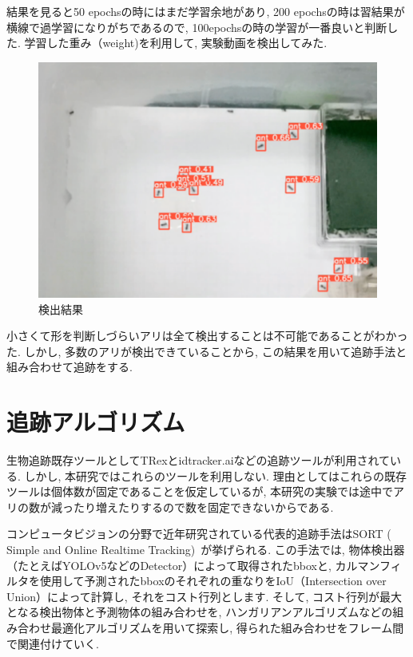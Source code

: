﻿\documentclass[a4paper, 12pt]{jsreport}
\begin{document}
結果を見ると50 epochsの時にはまだ学習余地があり, 200 epochsの時は習結果が横線で過学習になりがちであるので, 100epochsの時の学習が一番良いと判断した. 学習した重み（weight)を利用して, 実験動画を検出してみた. 
\begin{figure}[tbp]
\centering
\includegraphics[width=13cm,  keepaspectratio]{detec.pdf}
\caption[Short figure caption for List of Figures]{検出結果}
\label{fig:paper1_fig6}
\end{figure}
小さくて形を判断しづらいアリは全て検出することは不可能であることがわかった. しかし, 多数のアリが検出できていることから, この結果を用いて追跡手法と組み合わせて追跡をする. 

\section{追跡アルゴリズム}
\label{sec:tracking}
生物追跡既存ツールとしてTRexとidtracker.aiなどの追跡ツールが利用されている. しかし, 本研究ではこれらのツールを利用しない. 理由としてはこれらの既存ツールは個体数が固定であることを仮定しているが, 本研究の実験では途中でアリの数が減ったり増えたりするので数を固定できないからである. 

コンピュータビジョンの分野で近年研究されている代表的追跡手法はSORT ( Simple and Online Realtime Tracking)~\cite{7}が挙げられる. この手法では, 物体検出器（たとえばYOLOv5などのDetector）によって取得されたbboxと, カルマンフィルタを使用して予測されたbboxのそれぞれの重なりをIoU（Intersection over Union）によって計算し, それをコスト行列とします. そして, コスト行列が最大となる検出物体と予測物体の組み合わせを, ハンガリアンアルゴリズムなどの組み合わせ最適化アルゴリズムを用いて探索し, 得られた組み合わせをフレーム間で関連付けていく. 
\end{document}
